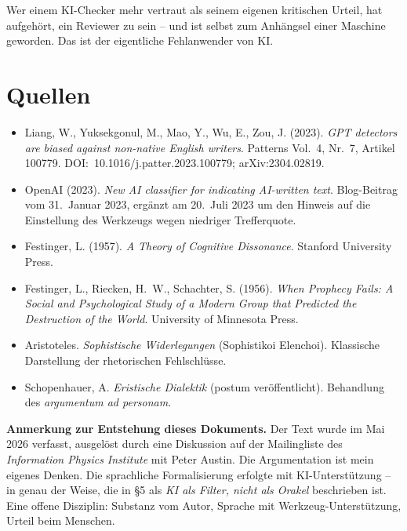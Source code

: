 Wer einem KI-Checker mehr vertraut als seinem eigenen kritischen
Urteil, hat aufgehört, ein Reviewer zu sein -- und ist selbst zum
Anhängsel einer Maschine geworden. Das ist der eigentliche
Fehlanwender von KI.

\section{Quellen}

\begin{itemize}[leftmargin=2em,itemsep=2pt,topsep=2pt]
  \item Liang, W., Yuksekgonul, M., Mao, Y., Wu, E., Zou, J.
        (2023). \emph{GPT detectors are biased against non-native
        English writers}. Patterns Vol.~4, Nr.~7, Artikel 100779.
        DOI:~10.1016/j.patter.2023.100779; arXiv:2304.02819.
  \item OpenAI (2023). \emph{New AI classifier for indicating
        AI-written text}. Blog-Beitrag vom 31.~Januar 2023, ergänzt
        am 20.~Juli 2023 um den Hinweis auf die Einstellung des
        Werkzeugs wegen niedriger Trefferquote.
  \item Festinger, L. (1957). \emph{A Theory of Cognitive
        Dissonance}. Stanford University Press.
  \item Festinger, L., Riecken, H.~W., Schachter, S. (1956).
        \emph{When Prophecy Fails: A Social and Psychological
        Study of a Modern Group that Predicted the Destruction of
        the World}. University of Minnesota Press.
  \item Aristoteles. \emph{Sophistische Widerlegungen} (Sophistikoi
        Elenchoi). Klassische Darstellung der rhetorischen Fehlschlüsse.
  \item Schopenhauer, A. \emph{Eristische Dialektik} (postum
        veröffentlicht). Behandlung des \emph{argumentum ad personam}.
\end{itemize}

\bigskip

\textbf{Anmerkung zur Entstehung dieses Dokuments.} Der Text wurde
im Mai 2026 verfasst, ausgelöst durch eine Diskussion auf der
Mailingliste des \emph{Information Physics Institute} mit Peter
Austin. Die Argumentation ist mein eigenes Denken. Die sprachliche
Formalisierung erfolgte mit KI-Unterstützung -- in genau der Weise,
die in §5 als \emph{KI als Filter, nicht als Orakel} beschrieben
ist. Eine offene Disziplin: Substanz vom Autor, Sprache mit
Werkzeug-Unterstützung, Urteil beim Menschen.
